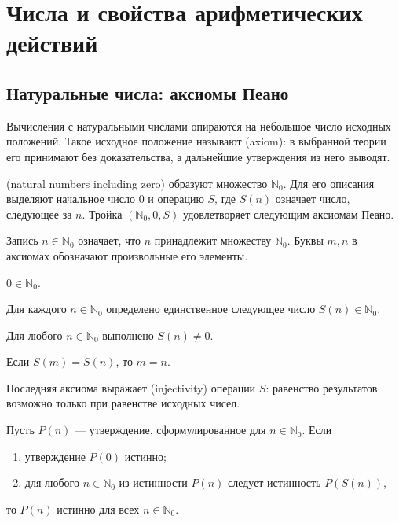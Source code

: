 \chapter{Числа и свойства арифметических действий}\label{chap:c01}
\section{Натуральные числа: аксиомы Пеано}

Вычисления с натуральными числами опираются на небольшое число исходных положений.
Такое исходное положение называют  (axiom): в выбранной теории его принимают без доказательства,
а дальнейшие утверждения из него выводят.

\begin{definition}
 (natural numbers including zero) образуют множество \(\mathbb N_0\).
Для его описания выделяют начальное число \(0\) и операцию \(S\),
где \(S(n)\) означает число, следующее за \(n\).
Тройка \((\mathbb N_0,0,S)\) удовлетворяет следующим аксиомам Пеано.
\end{definition}

Запись \(n\in\mathbb N_0\) означает, что \(n\) принадлежит множеству \(\mathbb N_0\).
Буквы \(m,n\) в аксиомах обозначают произвольные его элементы.

\begin{axiom}
\(0\in\mathbb N_0\).
\end{axiom}

\begin{axiom}
Для каждого \(n\in\mathbb N_0\) определено единственное следующее число \(S(n)\in\mathbb N_0\).
\end{axiom}

\begin{axiom}
Для любого \(n\in\mathbb N_0\) выполнено \(S(n)\ne0\).
\end{axiom}

\begin{axiom}
Если \(S(m)=S(n)\), то \(m=n\).
\end{axiom}

Последняя аксиома выражает  (injectivity) операции \(S\):
равенство результатов возможно только при равенстве исходных чисел.

\begin{axiom}
Пусть \(P(n)\) --- утверждение, сформулированное для \(n\in\mathbb N_0\).
Если
\begin{enumerate}[label=\arabic*.,leftmargin=2em,itemsep=3pt]
\item утверждение \(P(0)\) истинно;
\item для любого \(n\in\mathbb N_0\) из истинности \(P(n)\) следует истинность \(P(S(n))\),
\end{enumerate}
то \(P(n)\) истинно для всех \(n\in\mathbb N_0\).
\end{axiom}

